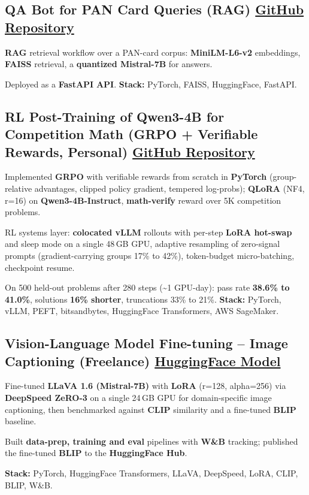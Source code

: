\documentclass[letter,10pt]{article}
\begin{document}
\subsection{QA Bot for PAN Card Queries (RAG) \hfill \href{https://github.com/sunil448832/Natural-Language-Processing/tree/master/RAG(Retrieval\%20Augment\%20Generation)}{GitHub Repository}}
\begin{zitemize}
\item \textbf{RAG} retrieval workflow over a PAN-card corpus: \textbf{MiniLM-L6-v2} embeddings, \textbf{FAISS} retrieval, a \textbf{quantized Mistral-7B} for answers.
\item Deployed as a \textbf{FastAPI} \textbf{API}. \textbf{Stack:} PyTorch, FAISS, HuggingFace, FastAPI.
\end{zitemize}

\subsection{RL Post-Training of Qwen3-4B for Competition Math (GRPO + Verifiable Rewards, Personal) \hfill \href{https://github.com/sunil448832/preference-alignment-grpo}{GitHub Repository}}
\begin{zitemize}
\item Implemented \textbf{GRPO} with verifiable rewards from scratch in \textbf{PyTorch} (group-relative advantages, clipped policy gradient, tempered log-probs); \textbf{QLoRA} (NF4, r=16) on \textbf{Qwen3-4B-Instruct}, \textbf{math-verify} reward over 5K competition problems.
\item RL systems layer: \textbf{colocated vLLM} rollouts with per-step \textbf{LoRA hot-swap} and sleep mode on a single 48\,GB GPU, adaptive resampling of zero-signal prompts (gradient-carrying groups 17\% to 42\%), token-budget micro-batching, checkpoint resume.
\item On 500 held-out problems after 280 steps (\textasciitilde1 GPU-day): pass rate \textbf{38.6\% to 41.0\%}, solutions \textbf{16\% shorter}, truncations 33\% to 21\%. \textbf{Stack:} PyTorch, vLLM, PEFT, bitsandbytes, HuggingFace Transformers, AWS SageMaker.
\end{zitemize}

\subsection{Vision-Language Model Fine-tuning – Image Captioning (Freelance) \hfill \href{https://huggingface.co/sunil448832/blip-model}{HuggingFace Model}}
\begin{zitemize}
\item Fine-tuned \textbf{LLaVA 1.6 (Mistral-7B)} with \textbf{LoRA} (r=128, alpha=256) via \textbf{DeepSpeed ZeRO-3} on a single 24\,GB GPU for domain-specific image captioning, then benchmarked against \textbf{CLIP} similarity and a fine-tuned \textbf{BLIP} baseline.
\item Built \textbf{data-prep, training and eval} pipelines with \textbf{W\&B} tracking; published the fine-tuned \textbf{BLIP} to the \textbf{HuggingFace Hub}.
\item \textbf{Stack:} PyTorch, HuggingFace Transformers, LLaVA, DeepSpeed, LoRA, CLIP, BLIP, W\&B.
\end{zitemize}
\end{document}

